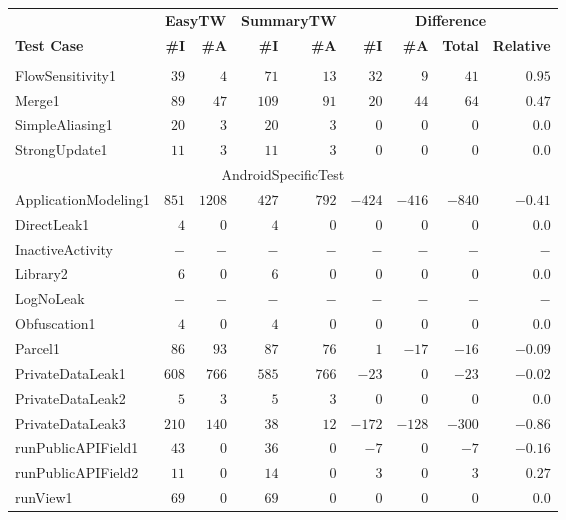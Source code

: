 \documentclass[../draft.tex]{subfiles}
\newcommand{\tsubEight}[1]{\multicolumn{9}{c}{#1}\\\hline}
\begin{document}
    \footnotesize
    \begin{longtable}{l | r | r | r | r | r | r | r | r}
        & \multicolumn{2}{c|}{\textbf{EasyTW}} & \multicolumn{2}{c|}{\textbf{SummaryTW}} & \multicolumn{4}{c}{\textbf{Difference}}\\
        \multirow{-2}{*}{\textbf{Test Case}} & \textbf{\#I} & \textbf{\#A} & \textbf{\#I} & \textbf{\#A} & \textbf{\#I} & \textbf{\#A}& \textbf{Total} & \textbf{Relative}\\
        \hhline
        \endhead
        \hline
        \tsubEight{AliasingTest}
        FlowSensitivity1 & $39$ & $4$ & $71$ & $13$ & $32$ & $9$ & $41$ & $0.95$\\
        Merge1 & $89$ & $47$ & $109$ & $91$ & $20$ & $44$ & $64$ & $0.47$\\
        SimpleAliasing1 & $20$ & $3$ & $20$ & $3$ & $0$ & $0$ & $0$ & $0.0$\\
        StrongUpdate1 & $11$ & $3$ & $11$ & $3$ & $0$ & $0$ & $0$ & $0.0$\\
        \hline
        \tsubEight{AndroidSpecificTest}
        ApplicationModeling1 & $851$ & $1208$ & $427$ & $792$ & $-424$ & $-416$ & $-840$ & $-0.41$\\
        DirectLeak1 & $4$ & $0$ & $4$ & $0$ & $0$ & $0$ & $0$ & $0.0$\\
        InactiveActivity & $-$ & $-$ & $-$ & $-$ & $-$ & $-$ & $-$ & $-$\\
        Library2 & $6$ & $0$ & $6$ & $0$ & $0$ & $0$ & $0$ & $0.0$\\
        LogNoLeak & $-$ & $-$ & $-$ & $-$ & $-$ & $-$ & $-$ & $-$\\
        Obfuscation1 & $4$ & $0$ & $4$ & $0$ & $0$ & $0$ & $0$ & $0.0$\\
        Parcel1 & $86$ & $93$ & $87$ & $76$ & $1$ & $-17$ & $-16$ & $-0.09$\\
        PrivateDataLeak1 & $608$ & $766$ & $585$ & $766$ & $-23$ & $0$ & $-23$ & $-0.02$\\
        PrivateDataLeak2 & $5$ & $3$ & $5$ & $3$ & $0$ & $0$ & $0$ & $0.0$\\
        PrivateDataLeak3 & $210$ & $140$ & $38$ & $12$ & $-172$ & $-128$ & $-300$ & $-0.86$\\
        runPublicAPIField1 & $43$ & $0$ & $36$ & $0$ & $-7$ & $0$ & $-7$ & $-0.16$\\
        runPublicAPIField2 & $11$ & $0$ & $14$ & $0$ & $3$ & $0$ & $3$ & $0.27$\\
        runView1 & $69$ & $0$ & $69$ & $0$ & $0$ & $0$ & $0$ & $0.0$\\

\end{longtable}
\end{document}
